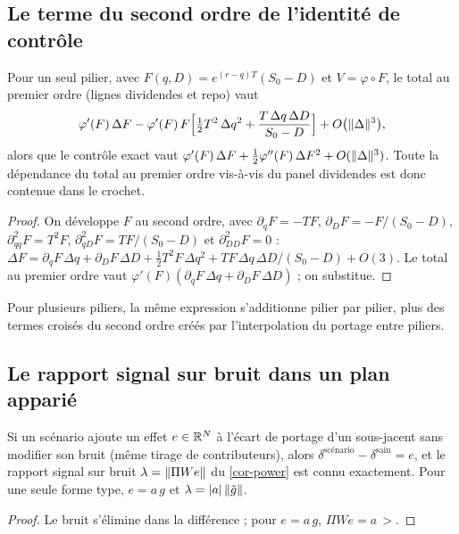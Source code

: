\subsection{Le terme du second ordre de l'identité de contrôle}\label{app-second}
\begin{proposition}\label{prop-second}
Pour un seul pilier, avec $F(q, D)=e^{(r-q)T}(S_0-D)$ et $V=\varphi\circ F$, le total au premier ordre (lignes
dividendes et repo) vaut
\[
\varphi'(F)\,\Delta F-\varphi'(F)\,F\Bigl[\tfrac12T^2\,\Delta q^2+\frac{T\,\Delta q\,\Delta D}{S_0-D}\Bigr]
+O\bigl(\lVert \Delta\rVert^3\bigr),
\]
alors que le contrôle exact vaut $\varphi'(F)\,\Delta F+\frac12\varphi''(F)\,\Delta F^2+O(\lVert \Delta\rVert^3)$. Toute la
dépendance du total au premier ordre vis-à-vis du panel dividendes est donc contenue dans le crochet.
\end{proposition}
\begin{proof}
On développe $F$ au second ordre, avec $\partial_qF=-TF$, $\partial_DF=-F/(S_0-D)$, $\partial^2_{qq}F=T^2F$,
$\partial^2_{qD}F=TF/(S_0-D)$ et $\partial^2_{DD}F=0$ :
$\Delta F=\partial_qF\,\Delta q+\partial_DF\,\Delta D+\frac12T^2F\,\Delta q^2+TF\,\Delta q\,\Delta D/(S_0-D)+O(3)$. Le total au
premier ordre vaut $\varphi'(F)(\partial_qF\,\Delta q+\partial_DF\,\Delta D)$ ; on substitue.
\end{proof}
Pour plusieurs piliers, la même expression s'additionne pilier par pilier, plus des termes croisés du second ordre
créés par l'interpolation du portage entre piliers.

\subsection{Le rapport signal sur bruit dans un plan apparié}
\begin{lemma}
Si un scénario ajoute un effet $e\in\mathbb{R}^N$ à l'écart de portage d'un sous-jacent sans modifier son bruit (même tirage de
contributeurs), alors $\delta^{\text{scénario}}-\delta^{\text{sain}}=e$, et le rapport signal sur bruit
$\lambda=\lVert \Pi We\rVert$ du \cref{cor-power} est connu exactement. Pour une seule forme type, $e=a\,g$ et
$\lambda=|a|\,\lVert \tilde g\rVert$.
\end{lemma}
\begin{proof}
Le bruit s'élimine dans la différence ; pour $e=a\,g$, $\Pi We=a\,\gt$.
\end{proof}

